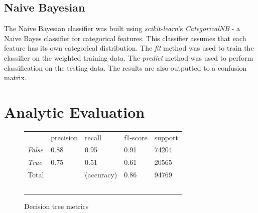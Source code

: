 \documentclass[10pt, conference, compsocconf]{IEEEtran}
\begin{document}
\subsection{Naive Bayesian}

The Naive Bayesian classifier was built using \textit{scikit-learn}'s \textit{CategoricalNB} - a Naive Bayes classifier for categorical features. This classifier assumes that each feature has its own categorical distribution. The \textit{fit} method was used to train the classifier on the weighted training data. The \textit{predict} method was used to perform classification on the testing data. The results are also outputted to a confusion matrix.

\section{Analytic Evaluation}


\begin{figure}
  \begin{tabular}{lllll}
                  & precision & recall      & f1-score  & support \\
  \textit{False}  & 0.88      & 0.95        & 0.91      & 74204 \\
  \textit{True}   & 0.75      & 0.51        & 0.61      & 20565 \\
  Total           &           & (accuracy)  & 0.86      & 94769 \\\
  \end{tabular}
  \caption{Decision tree metrics}
  \label{fig:decision_tree_metrics}
\end{figure}
\end{document}
